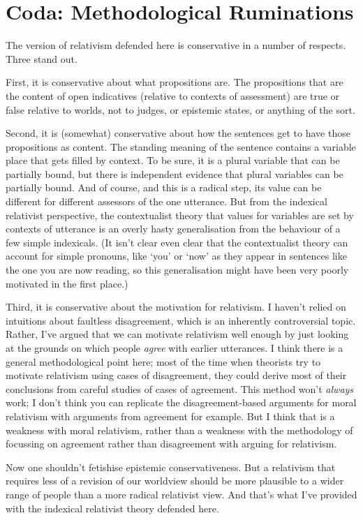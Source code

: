 \section*{Coda: Methodological Ruminations}

The version of relativism defended here is conservative in a number of respects. Three stand out.

First, it is conservative about what propositions are. The propositions that are the content of open indicatives (relative to contexts of assessment) are true or false relative to worlds, not to judges, or epistemic states, or anything of the sort.

Second, it is (somewhat) conservative about how the sentences get to have those propositions as content. The standing meaning of the sentence contains a variable place that gets filled by context. To be sure, it is a plural variable that can be partially bound, but there is independent evidence that plural variables can be partially bound. And of course, and this is a radical step, its value can be different for different assessors of the one utterance. But from the indexical relativist perspective, the contextualist theory that values for variables are set by contexts of utterance is an overly hasty generalisation from the behaviour of a few simple indexicals. (It isn't clear even clear that the contextualist theory can account for simple pronouns, like `you' or `now' as they appear in sentences like the one you are now reading, so this generalisation might have been very poorly motivated in the first place.)

Third, it is conservative about the motivation for relativism. I haven't relied on intuitions about faultless disagreement, which is an inherently controversial topic. Rather, I've argued that we can motivate relativism well enough by just looking at the grounds on which people \textit{agree} with earlier utterances. I think there is a general methodological point here; most of the time when theorists try to motivate relativism using cases of disagreement, they could derive most of their conclusions from careful studies of cases of agreement. This method won't \textit{always} work; I don't think you can replicate the disagreement-based arguments for moral relativism with arguments from agreement for example. But I think that is a weakness with moral relativism, rather than a weakness with the methodology of focussing on agreement rather than disagreement with arguing for relativism.

Now one shouldn't fetishise epistemic conservativeness. But a relativism that requires less of a revision of our worldview should be more plausible to a wider range of people than a more radical relativist view. And that's what I've provided with the indexical relativist theory defended here.
%

